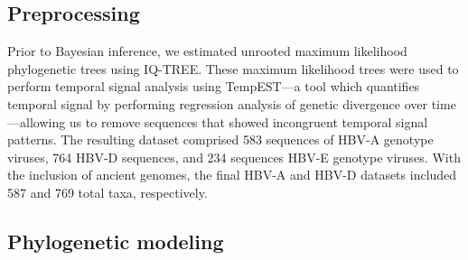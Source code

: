 \subsection{Preprocessing}

Prior to Bayesian inference, we estimated unrooted maximum likelihood phylogenetic trees using IQ-TREE\cite{nguyen2015iq}.
These maximum likelihood trees were used to perform temporal signal analysis using TempEST\cite{rambaut2016exploring}---a tool which quantifies temporal signal by performing regression analysis of genetic divergence over time---allowing us to remove sequences that showed incongruent temporal signal patterns.
The resulting dataset comprised 583 sequences of HBV-A genotype viruses, 764 HBV-D sequences, and 234 sequences HBV-E genotype viruses.
With the inclusion of ancient genomes, the final HBV-A and HBV-D datasets included 587 and 769 total taxa, respectively.

\subsection{Phylogenetic modeling}

